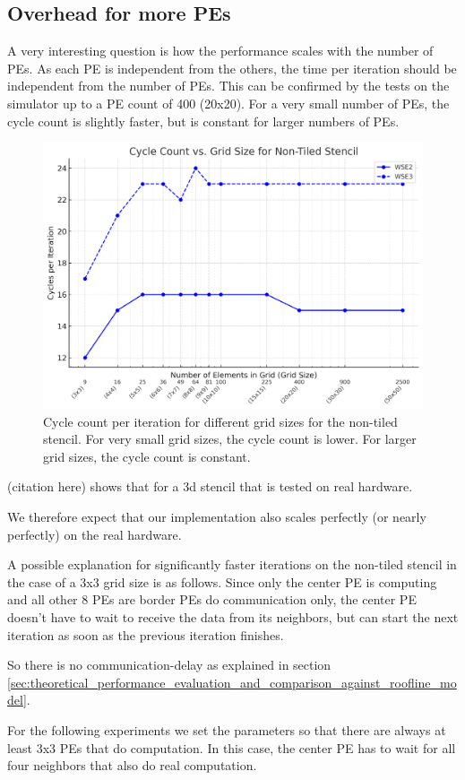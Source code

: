\documentclass{article}
\begin{document}
\subsection{Overhead for more PEs}
A very interesting question is how the performance scales with the number of PEs.
As each PE is independent from the others, the time per iteration should be independent from the number of PEs.
This can be confirmed by the tests on the simulator up to a PE count of 400 (20x20).
For a very small number of PEs, the cycle count is slightly faster, but is constant for larger numbers of PEs.

\begin{figure}[h]
    \centering
    \includegraphics[width=0.5\linewidth]{plots/pe_overhead_non_tiled.png}
    \caption{Cycle count per iteration for different grid sizes for the non-tiled stencil. For very small grid sizes, the cycle count is lower. For larger grid sizes, the cycle count is constant.}
    \label{fig:pe_overhead}
\end{figure}

(citation here) shows that for a 3d stencil that is tested on real hardware.

We therefore expect that our implementation also scales perfectly (or nearly perfectly) on the real hardware.

A possible explanation for significantly faster iterations on the non-tiled stencil in the case of a 3x3 grid size is as follows. Since only the center PE is computing and all other 8 PEs are border PEs do communication only, the center PE doesn't have to wait to receive the data from its neighbors, but can start the next iteration as soon as the previous iteration finishes.

So there is no communication-delay as explained in section \ref{sec:theoretical_performance_evaluation_and_comparison_against_roofline_model}.

For the following experiments we set the parameters so that there are always at least 3x3 PEs that do computation. In this case, the center PE has to wait for all four neighbors that also do real computation.
\end{document}
